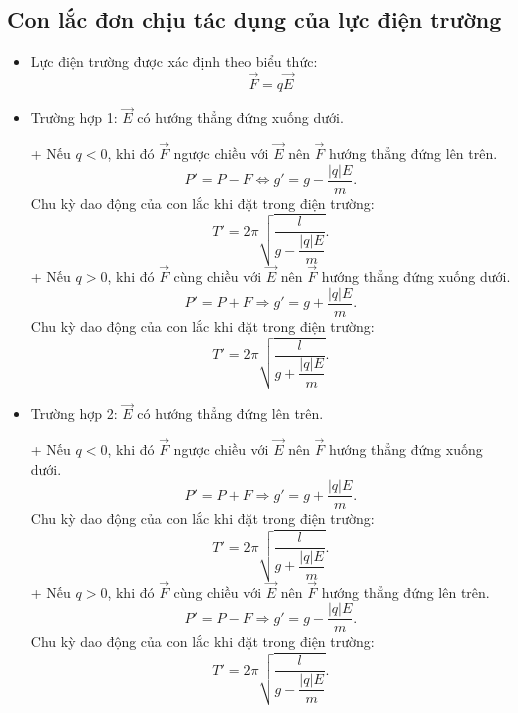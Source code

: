 \subsection{Con lắc đơn chịu tác dụng của lực điện trường}
\begin{itemize}
	\item Lực điện trường được xác định theo biểu thức:
	\begin{equation*}
		\vec{F}=q \vec{E}
	\end{equation*}
	\item Trường hợp 1: $\vec{E}$ có hướng thẳng đứng xuống dưới.
	
	+ Nếu $q <0$, khi đó $\vec{F}$ ngược chiều với $\vec{E}$ nên $\vec{F}$ hướng thẳng đứng lên trên.
	\begin{equation*}
		P'=P-F \Leftrightarrow g'=g - \dfrac{|q|E}{m}.
	\end{equation*}
	Chu kỳ dao động của con lắc khi đặt trong điện trường:
	\begin{equation*}
		T' =2\pi \sqrt{\dfrac{l}{g-\dfrac{|q|E}{m}}}.
	\end{equation*}
	+ Nếu $q >0$, khi đó $\vec{F}$ cùng chiều với $\vec{E}$ nên $\vec{F}$ hướng thẳng đứng xuống dưới.
	\begin{equation*}
		P'=P+F \Rightarrow g'=g + \dfrac{|q|E}{m}.
	\end{equation*}
	Chu kỳ dao động của con lắc khi đặt trong điện trường:
	\begin{equation*}
		T'=2\pi \sqrt{\dfrac{l}{g+\dfrac{|q|E}{m}}}.
	\end{equation*}
	\item Trường hợp 2: $\vec{E}$ có hướng thẳng đứng lên trên.
	
	+ Nếu $q <0$, khi đó $\vec{F}$ ngược chiều với $\vec{E}$ nên $\vec{F}$ hướng thẳng đứng xuống dưới.
	\begin{equation*}
		P'=P+F \Rightarrow g'=g + \dfrac{|q|E}{m}.
	\end{equation*}
	Chu kỳ dao động của con lắc khi đặt trong điện trường:
	\begin{equation*}
		T' =2\pi \sqrt{\dfrac{l}{g+\dfrac{|q|E}{m}}}.
	\end{equation*}
	+ Nếu $q >0$, khi đó $\vec{F}$ cùng chiều với $\vec{E}$ nên $\vec{F}$ hướng thẳng đứng lên trên.
	\begin{equation*}
		P'=P-F \Rightarrow g'=g - \dfrac{|q|E}{m}.
	\end{equation*}
	Chu kỳ dao động của con lắc khi đặt trong điện trường:
	\begin{equation*}
		T' =2\pi \sqrt{\dfrac{l}{g-\dfrac{|q|E}{m}}}.
	\end{equation*}
	

\end{itemize}
